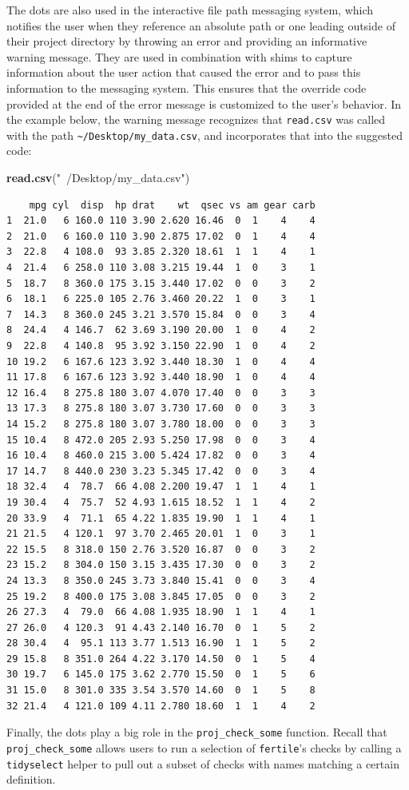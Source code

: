 \documentclass[12pt,twoside]{reedthesis}
\newenvironment{Shaded}{\begin{snugshade}}{\end{snugshade}}
\newcommand{\KeywordTok}[1]{\textcolor[rgb]{0.13,0.29,0.53}{\textbf{#1}}}
\newcommand{\NormalTok}[1]{#1}
\newcommand{\StringTok}[1]{\textcolor[rgb]{0.31,0.60,0.02}{#1}}
\begin{document}
The dots are also used in the interactive file path messaging system, which notifies the user when they reference an absolute path or one leading outside of their project directory by throwing an error and providing an informative warning message. They are used in combination with shims to capture information about the user action that caused the error and to pass this information to the messaging system. This ensures that the override code provided at the end of the error message is customized to the user's behavior. In the example below, the warning message recognizes that \texttt{read.csv} was called with the path \texttt{\textasciitilde{}/Desktop/my\_data.csv}, and incorporates that into the suggested code:
\begin{Shaded}
\begin{Highlighting}[]
\KeywordTok{read.csv}\NormalTok{(}\StringTok{"~/Desktop/my_data.csv"}\NormalTok{)}
\end{Highlighting}
\end{Shaded}
\begin{verbatim}
    mpg cyl  disp  hp drat    wt  qsec vs am gear carb
1  21.0   6 160.0 110 3.90 2.620 16.46  0  1    4    4
2  21.0   6 160.0 110 3.90 2.875 17.02  0  1    4    4
3  22.8   4 108.0  93 3.85 2.320 18.61  1  1    4    1
4  21.4   6 258.0 110 3.08 3.215 19.44  1  0    3    1
5  18.7   8 360.0 175 3.15 3.440 17.02  0  0    3    2
6  18.1   6 225.0 105 2.76 3.460 20.22  1  0    3    1
7  14.3   8 360.0 245 3.21 3.570 15.84  0  0    3    4
8  24.4   4 146.7  62 3.69 3.190 20.00  1  0    4    2
9  22.8   4 140.8  95 3.92 3.150 22.90  1  0    4    2
10 19.2   6 167.6 123 3.92 3.440 18.30  1  0    4    4
11 17.8   6 167.6 123 3.92 3.440 18.90  1  0    4    4
12 16.4   8 275.8 180 3.07 4.070 17.40  0  0    3    3
13 17.3   8 275.8 180 3.07 3.730 17.60  0  0    3    3
14 15.2   8 275.8 180 3.07 3.780 18.00  0  0    3    3
15 10.4   8 472.0 205 2.93 5.250 17.98  0  0    3    4
16 10.4   8 460.0 215 3.00 5.424 17.82  0  0    3    4
17 14.7   8 440.0 230 3.23 5.345 17.42  0  0    3    4
18 32.4   4  78.7  66 4.08 2.200 19.47  1  1    4    1
19 30.4   4  75.7  52 4.93 1.615 18.52  1  1    4    2
20 33.9   4  71.1  65 4.22 1.835 19.90  1  1    4    1
21 21.5   4 120.1  97 3.70 2.465 20.01  1  0    3    1
22 15.5   8 318.0 150 2.76 3.520 16.87  0  0    3    2
23 15.2   8 304.0 150 3.15 3.435 17.30  0  0    3    2
24 13.3   8 350.0 245 3.73 3.840 15.41  0  0    3    4
25 19.2   8 400.0 175 3.08 3.845 17.05  0  0    3    2
26 27.3   4  79.0  66 4.08 1.935 18.90  1  1    4    1
27 26.0   4 120.3  91 4.43 2.140 16.70  0  1    5    2
28 30.4   4  95.1 113 3.77 1.513 16.90  1  1    5    2
29 15.8   8 351.0 264 4.22 3.170 14.50  0  1    5    4
30 19.7   6 145.0 175 3.62 2.770 15.50  0  1    5    6
31 15.0   8 301.0 335 3.54 3.570 14.60  0  1    5    8
32 21.4   4 121.0 109 4.11 2.780 18.60  1  1    4    2
\end{verbatim}
Finally, the dots play a big role in the \texttt{proj\_check\_some} function. Recall that \texttt{proj\_check\_some} allows users to run a selection of \texttt{fertile}'s checks by calling a \texttt{tidyselect} helper to pull out a subset of checks with names matching a certain definition.
\end{document}
